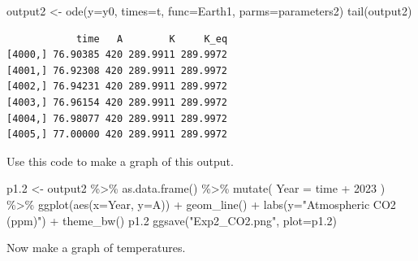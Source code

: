 \documentclass[
  letterpaper,
  DIV=11,
  numbers=noendperiod]{scrreprt}
\newenvironment{Shaded}{\begin{snugshade}}{\end{snugshade}}
\newcommand{\AttributeTok}[1]{\textcolor[rgb]{0.40,0.45,0.13}{#1}}
\newcommand{\DecValTok}[1]{\textcolor[rgb]{0.68,0.00,0.00}{#1}}
\newcommand{\FloatTok}[1]{\textcolor[rgb]{0.68,0.00,0.00}{#1}}
\newcommand{\FunctionTok}[1]{\textcolor[rgb]{0.28,0.35,0.67}{#1}}
\newcommand{\NormalTok}[1]{\textcolor[rgb]{0.00,0.23,0.31}{#1}}
\newcommand{\OtherTok}[1]{\textcolor[rgb]{0.00,0.23,0.31}{#1}}
\newcommand{\SpecialCharTok}[1]{\textcolor[rgb]{0.37,0.37,0.37}{#1}}
\newcommand{\StringTok}[1]{\textcolor[rgb]{0.13,0.47,0.30}{#1}}
\begin{document}
\begin{Shaded}
\begin{Highlighting}[]
\NormalTok{output2 }\OtherTok{\textless{}{-}} \FunctionTok{ode}\NormalTok{(}\AttributeTok{y=}\NormalTok{y0, }\AttributeTok{times=}\NormalTok{t, }\AttributeTok{func=}\NormalTok{Earth1, }\AttributeTok{parms=}\NormalTok{parameters2)}
\FunctionTok{tail}\NormalTok{(output2)}
\end{Highlighting}
\end{Shaded}

\begin{verbatim}
            time   A        K     K_eq
[4000,] 76.90385 420 289.9911 289.9972
[4001,] 76.92308 420 289.9911 289.9972
[4002,] 76.94231 420 289.9911 289.9972
[4003,] 76.96154 420 289.9911 289.9972
[4004,] 76.98077 420 289.9911 289.9972
[4005,] 77.00000 420 289.9911 289.9972
\end{verbatim}

Use this code to make a graph of this output.

\begin{Shaded}
\begin{Highlighting}[]
\NormalTok{p1}\FloatTok{.2} \OtherTok{\textless{}{-}}\NormalTok{ output2 }\SpecialCharTok{\%\textgreater{}\%} \FunctionTok{as.data.frame}\NormalTok{() }\SpecialCharTok{\%\textgreater{}\%}
  \FunctionTok{mutate}\NormalTok{(}
    \AttributeTok{Year =}\NormalTok{ time }\SpecialCharTok{+} \DecValTok{2023}
\NormalTok{  ) }\SpecialCharTok{\%\textgreater{}\%}
  \FunctionTok{ggplot}\NormalTok{(}\FunctionTok{aes}\NormalTok{(}\AttributeTok{x=}\NormalTok{Year, }\AttributeTok{y=}\NormalTok{A)) }\SpecialCharTok{+} 
  \FunctionTok{geom\_line}\NormalTok{() }\SpecialCharTok{+} \FunctionTok{labs}\NormalTok{(}\AttributeTok{y=}\StringTok{"Atmospheric CO2 (ppm)"}\NormalTok{) }\SpecialCharTok{+}
  \FunctionTok{theme\_bw}\NormalTok{()}
\NormalTok{p1}\FloatTok{.2}
\FunctionTok{ggsave}\NormalTok{(}\StringTok{"Exp2\_CO2.png"}\NormalTok{, }\AttributeTok{plot=}\NormalTok{p1}\FloatTok{.2}\NormalTok{)}
\end{Highlighting}
\end{Shaded}

Now make a graph of temperatures.
\end{document}
